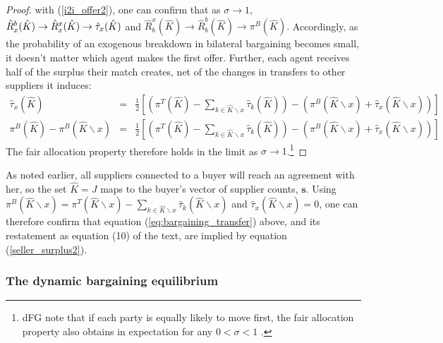 \documentclass[12pt]{article} \usepackage{amsmath,amssymb,amsthm,geometry,graphicx,setspace,algorithm,algpseudocode,float}
\begin{document}
\begin{proof}
with (\ref{i2i_offer2}), one can confirm that as $\sigma \rightarrow 1,$ $%
\hat{R}_{x}^{b}(\hat{K})\rightarrow \hat{R}_{x}^{x}(\hat{K})\rightarrow \hat{%
\tau}_{x}(\hat{K})$ and $\hat{R}_{b}^{x}(\hat{K})\rightarrow \hat{R}_{b}^{b}(%
\hat{K})\rightarrow \pi ^{B}(\hat{K}).$ Accordingly, as the probability of an exogenous breakdown in bilateral bargaining becomes small, it doesn't matter which agent makes the first offer. Further, each agent receives half of the surplus their match creates, net of the changes in transfers to other suppliers it induces:%
\begin{eqnarray}
\hat{\tau}_{x}(\hat{K})
&=&\frac{1}{2}%
\left[ \left(\pi ^{T}(\hat{K})-\sum\limits_{k\in \hat{K}\backslash x} \hat{\tau}_{k}(\hat{K})  \right)
-\left( \pi ^{B}(\hat{K}\backslash x)+\hat{\tau}_{x}(\hat{K}\backslash
x)\right) \right]   \label{seller_surplus2} 
 \\
\pi ^{B}(\hat{K}) -\pi^{B}(%
\hat{K}\backslash x)
&=&\frac{1}{2}\left[ \left(\pi ^{T}(\hat{K})-\sum\limits_{k\in \hat{K}\backslash x} \hat{\tau}_{k}(\hat{K})  \right) -\left( \pi ^{B}(%
\hat{K}\backslash x)+\hat{\tau}_{x}(\hat{K}\backslash x)\right) \right]  
\label{buyer_surplus2}
\end{eqnarray}
The fair allocation property therefore holds in the limit as $\sigma
\rightarrow 1$.\footnote{%
dFG note that if each party is equally likely to move first, the fair allocation property also obtains in expectation for any $0<\sigma <1$ .} 
\end{proof}

As noted earlier, all suppliers connected to a buyer will reach an agreement with her, so the set $\hat{K}=J$ maps to the buyer's vector of supplier counts, $\mathbf{s}$. Using $\pi ^{B}(\hat{K} \backslash x)=\pi ^{T}(\hat{K} \backslash x)-\sum\limits_{k\in \hat{K} \backslash x} \hat{\tau}_{k}(\hat{K} \backslash x)$ and $\hat{\tau}_x(\hat{K} \backslash x)=0$, one can therefore confirm that equation (\ref{eq:bargaining_transfer}) above, and its restatement as equation (10) of the text, are implied by equation (\ref{seller_surplus2}). 

\subsubsection{The dynamic bargaining equilibrium}
\end{document}
